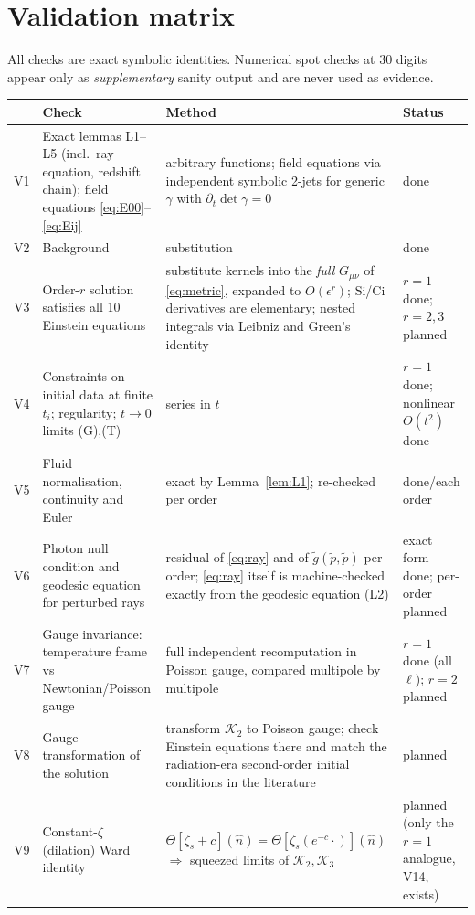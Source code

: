 \documentclass[11pt]{article}
\theoremstyle{definition}
\theoremstyle{remark}
\newcommand{\eps}{\epsilon}
\newcommand{\nhat}{\hat n}
\begin{document}
\section{Validation matrix}\label{sec:val}

All checks are exact symbolic identities. Numerical spot checks at 30
digits appear only as \emph{supplementary} sanity output and are never used
as evidence.

\begin{longtable}{@{}p{0.6cm}p{6.4cm}p{6.0cm}p{1.7cm}@{}}
\toprule
& Check & Method & Status\\\midrule\endhead
V1 & Exact lemmas L1--L5 (incl.\ ray equation, redshift chain); field equations \eqref{eq:E00}--\eqref{eq:Eij} & arbitrary functions; field equations via independent symbolic 2-jets for generic $\gamma$ with $\partial_t\det\gamma=0$ & done\\
V2 & Background & substitution & done\\
V3 & Order-$r$ solution satisfies all 10 Einstein equations & substitute kernels into the \emph{full} $G_{\mu\nu}$ of \eqref{eq:metric}, expanded to $O(\eps^r)$; Si/Ci derivatives are elementary; nested integrals via Leibniz and Green's identity & $r{=}1$ done; $r{=}2,3$ planned\\
V4 & Constraints on initial data at finite $t_i$; regularity; $t\to0$ limits (G),(T) & series in $t$ & $r{=}1$ done; nonlinear $O(t^2)$ done\\
V5 & Fluid normalisation, continuity and Euler & exact by Lemma~\ref{lem:L1}; re-checked per order & done/each order\\
V6 & Photon null condition and geodesic equation for perturbed rays & residual of \eqref{eq:ray} and of $\tilde g(\tilde p,\tilde p)$ per order; \eqref{eq:ray} itself is machine-checked exactly from the geodesic equation (L2) & exact form done; per-order planned\\
V7 & Gauge invariance: temperature frame vs Newtonian/Poisson gauge & full independent recomputation in Poisson gauge, compared multipole by multipole & $r{=}1$ done (all $\ell$); $r{=}2$ planned\\
V8 & Gauge transformation of the solution & transform $\mathcal K_2$ to Poisson gauge; check Einstein equations there and match the radiation-era second-order initial conditions in the literature & planned\\
V9 & Constant-$\zeta$ (dilation) Ward identity & $\Theta[\zeta_s+c](\nhat)=\Theta[\zeta_s(e^{-c}\cdot)](\nhat)$ $\Rightarrow$ squeezed limits of $\mathcal K_2,\mathcal K_3$ & planned (only the $r{=}1$ analogue, V14, exists)\\

\end{longtable}
\end{document}

